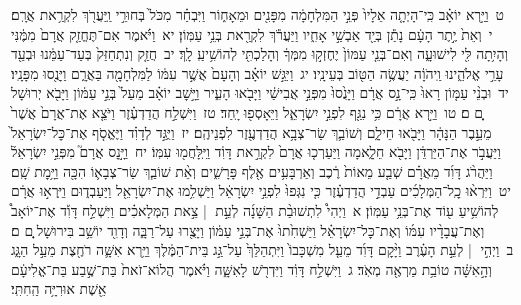 \documentclass[18pt]{article}
\newcommand{\kri}[1]{\Afootnote{#1}}	%
\begin{document}
 {\loc ט~}וַיַּ֣רְא יוֹאָ֗ב כִּֽי־הָיְתָ֤ה אֵלָיו֙ פְּנֵ֣י הַמִּלְחָמָ֔ה מִפָּנִ֖ים וּמֵאָח֑וֹר וַיִּבְחַ֗ר מִכֹּל֙ בְּחוּרֵ֣י  \edtext{(בישראל)}{\kri{קרי: יִשְׂרָאֵ֔ל}}  וַֽיַּעֲרֹ֖ךְ לִקְרַ֥את אֲרָֽם׃ \startlock
 {\loc י~}וְאֵת֙ יֶ֣תֶר הָעָ֔ם נָתַ֕ן בְּיַ֖ד אַבְשַׁ֣י אָחִ֑יו וַיַּעֲרֹ֕ךְ לִקְרַ֖את בְּנֵ֥י עַמּֽוֹן׃ \startlock
 {\loc יא~}וַיֹּ֗אמֶר אִם־תֶּחֱזַ֤ק אֲרָם֙ מִמֶּ֔נִּי וְהָיִ֥תָה לִּ֖י לִישׁוּעָ֑ה וְאִם־בְּנֵ֤י עַמּוֹן֙ יֶחֶזְק֣וּ מִמְּךָ֔ וְהָלַכְתִּ֖י לְהוֹשִׁ֥יעַֽ לָֽךְ׃ \startlock
 {\loc יב~}חֲזַ֤ק וְנִתְחַזַּק֙ בְּעַד־עַמֵּ֔נוּ וּבְעַ֖ד עָרֵ֣י אֱלֹהֵ֑ינוּ וַֽיהֹוָ֔ה יַעֲשֶׂ֥ה הַטּ֖וֹב בְּעֵינָֽיו׃ \startlock
 {\loc יג~}וַיִּגַּ֣שׁ יוֹאָ֗ב וְהָעָם֙ אֲשֶׁ֣ר עִמּ֔וֹ לַמִּלְחָמָ֖ה בַּאֲרָ֑ם וַיָּנֻ֖סוּ מִפָּנָֽיו׃ \startlock
 {\loc יד~}וּבְנֵ֨י עַמּ֤וֹן רָאוּ֙ כִּֽי־נָ֣ס אֲרָ֔ם וַיָּנֻ֙סוּ֙ מִפְּנֵ֣י אֲבִישַׁ֔י וַיָּבֹ֖אוּ הָעִ֑יר וַיָּ֣שׇׁב יוֹאָ֗ב מֵעַל֙ בְּנֵ֣י עַמּ֔וֹן וַיָּבֹ֖א יְרוּשָׁל ָֽ͏ְם ם׃ \startlock
 {\loc טו~}וַיַּ֣רְא אֲרָ֔ם כִּ֥י נִגַּ֖ף לִפְנֵ֣י יִשְׂרָאֵ֑ל וַיֵּאָסְפ֖וּ יָֽחַד׃ \startlock
 {\loc טז~}וַיִּשְׁלַ֣ח הֲדַדְעֶ֗זֶר וַיֹּצֵ֤א אֶת־אֲרָם֙ אֲשֶׁר֙ מֵעֵ֣בֶר הַנָּהָ֔ר וַיָּבֹ֖אוּ חֵילָ֑ם וְשׁוֹבַ֛ךְ שַׂר־צְבָ֥א הֲדַדְעֶ֖זֶר לִפְנֵיהֶֽם׃ \startlock
 {\loc יז~}וַיֻּגַּ֣ד לְדָוִ֗ד וַיֶּאֱסֹ֤ף אֶת־כׇּל־יִשְׂרָאֵל֙ וַיַּעֲבֹ֣ר אֶת־הַיַּרְדֵּ֔ן וַיָּבֹ֖א חֵלָ֑אמָה וַיַּעַרְכ֤וּ אֲרָם֙ לִקְרַ֣את דָּוִ֔ד וַיִּֽלָּחֲמ֖וּ עִמּֽוֹ׃ \startlock
 {\loc יח~}וַיָּ֣נׇס אֲרָם֮ מִפְּנֵ֣י יִשְׂרָאֵל֒ וַיַּהֲרֹ֨ג דָּוִ֜ד מֵאֲרָ֗ם שְׁבַ֤ע מֵאוֹת֙ רֶ֔כֶב וְאַרְבָּעִ֥ים אֶ֖לֶף פָּרָשִׁ֑ים וְאֵ֨ת שׁוֹבַ֧ךְ שַׂר־צְבָא֛וֹ הִכָּ֖ה וַיָּ֥מׇת שָֽׁם׃ \startlock
 {\loc יט~}וַיִּרְא֨וּ כׇֽל־הַמְּלָכִ֜ים עַבְדֵ֣י הֲדַדְעֶ֗זֶר כִּ֤י נִגְּפוּ֙ לִפְנֵ֣י יִשְׂרָאֵ֔ל וַיַּשְׁלִ֥מוּ אֶת־יִשְׂרָאֵ֖ל וַיַּעַבְד֑וּם וַיִּֽרְא֣וּ אֲרָ֔ם לְהוֹשִׁ֥יעַ ע֖וֹד אֶת־בְּנֵ֥י עַמּֽוֹן׃ 
\startlock
 {\loc א~}וַיְהִי֩ לִתְשׁוּבַ֨ת הַשָּׁנָ֜ה לְעֵ֣ת  |  צֵ֣את הַמְּלָאכִ֗ים וַיִּשְׁלַ֣ח דָּוִ֡ד אֶת־יוֹאָב֩ וְאֶת־עֲבָדָ֨יו עִמּ֜וֹ וְאֶת־כׇּל־יִשְׂרָאֵ֗ל וַיַּשְׁחִ֙תוּ֙ אֶת־בְּנֵ֣י עַמּ֔וֹן וַיָּצֻ֖רוּ עַל־רַבָּ֑ה וְדָוִ֖ד יוֹשֵׁ֥ב בִּירוּשָׁל ָֽ͏ְם ם׃ \startlock
 {\loc ב~}וַיְהִ֣י  |  לְעֵ֣ת הָעֶ֗רֶב וַיָּ֨קׇם דָּוִ֜ד מֵעַ֤ל מִשְׁכָּבוֹ֙ וַיִּתְהַלֵּךְ֙ עַל־גַּ֣ג בֵּית־הַמֶּ֔לֶךְ וַיַּ֥רְא אִשָּׁ֛ה רֹחֶ֖צֶת מֵעַ֣ל הַגָּ֑ג וְהָ֣אִשָּׁ֔ה טוֹבַ֥ת מַרְאֶ֖ה מְאֹֽד׃ \startlock
 {\loc ג~}וַיִּשְׁלַ֣ח דָּוִ֔ד וַיִּדְרֹ֖שׁ לָאִשָּׁ֑ה וַיֹּ֗אמֶר הֲלוֹא־זֹאת֙ בַּת־שֶׁ֣בַע בַּת־אֱלִיעָ֔ם אֵ֖שֶׁת אוּרִיָּ֥ה הַֽחִתִּֽי׃ \startlock
\end{document}
